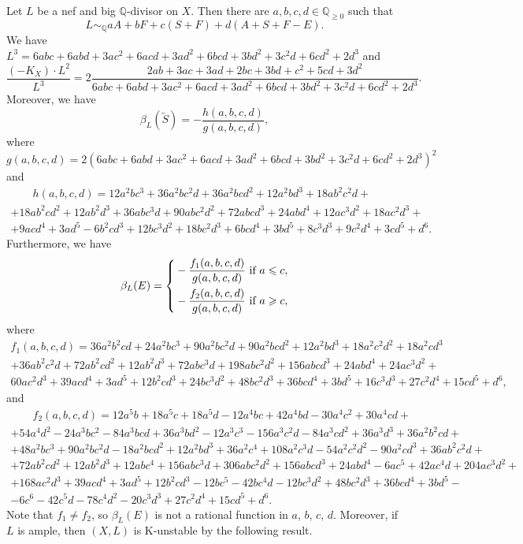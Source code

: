\documentclass[12pt]{amsart}
\theoremstyle{definition}
\theoremstyle{remark}
\begin{document}
Let $L$ be a nef and big $\mathbb{Q}$-divisor on $X$. Then there are $a,b,c,d\in\mathbb{Q}_{\geqslant 0}$ such that
$$
L\sim_{\mathbb{Q}} aA+bF+c(S+F)+d(A+S+F-E).
$$
We have $L^3=6abc+6abd+3ac^2+6acd+3ad^2+6bcd+3bd^2+3c^2d+6cd^2+2d^3$ and
$$
\frac{(-K_X)\cdot L^{2}}{L^3}=2\frac{2ab+3ac+3ad+2bc+3bd+c^2+5cd+3d^2}{6abc+6abd+3ac^2+6acd+3ad^2+6bcd+3bd^2+3c^2d+6cd^2+2d^3}.
$$
Moreover, we have
$$
\beta_{L}(\widetilde{S})=-\frac{h(a,b,c,d)}{g(a,b,c,d)},
$$
where $g(a,b,c,d)=2(6abc+6abd+3ac^2+6acd+3ad^2+6bcd+3bd^2+3c^2d+6cd^2+2d^3)^2$ and
\begin{multline*}
\quad \quad h(a,b,c,d)=12a^2bc^3+36a^2bc^2d+36a^2bcd^2+12a^2bd^3+18ab^2c^2d+\\
+18ab^2cd^2+12ab^2d^3+36abc^3d+90abc^2d^2+72abcd^3+24abd^4+12ac^3d^2+18ac^2d^3+\\
+9acd^4+3ad^5-6b^2cd^3+12bc^3d^2+18bc^2d^3+6bcd^4+3bd^5+8c^3d^3+9c^2d^4+3cd^5+d^6.\quad \quad \quad
\end{multline*}
Furthermore, we have
$$
\beta_{L}(E)=
\left\{\aligned
&-\frac{f_1(a,b,c,d)}{g(a,b,c,d)}\ \text{if $a\leqslant c$},\\
&-\frac{f_2(a,b,c,d)}{g(a,b,c,d)}\ \text{if $a\geqslant c$},
\endaligned
\right.
$$
where
\begin{multline*}
f_1(a,b,c,d)=36a^2b^2cd+24a^2bc^3+90a^2bc^2d+90a^2bcd^2+12a^2bd^3
+18a^2c^2d^2+18a^2cd^3\\+36ab^2c^2d+72ab^2cd^2+12ab^2d^3+72abc^3d+198abc^2d^2
+156abcd^3+24abd^4+24ac^3d^2+\\60ac^2d^3+39acd^4+3ad^5+12b^2cd^3+24bc^3d^2
+48bc^2d^3+36bcd^4+3bd^5+16c^3d^3+27c^2d^4+15cd^5+d^6,\quad \quad \quad \quad \quad \quad
\end{multline*}
and
\begin{multline*}
\quad \quad f_2(a,b,c,d)=12a^5b+18a^5c+18a^5d-12a^4bc+42a^4bd-30a^4c^2+30a^4cd+\\
+54a^4d^2-24a^3bc^2-84a^3bcd+36a^3bd^2-12a^3c^3-156a^3c^2d-84a^3cd^2+36a^3d^3+36a^2b^2cd+\\
+48a^2bc^3+90a^2bc^2d-18a^2bcd^2+12a^2bd^3+36a^2c^4+108a^2c^3d-54a^2c^2d^2-90a^2cd^3+36ab^2c^2d+\\
+72ab^2cd^2+12ab^2d^3+12abc^4+ 156abc^3d+306abc^2d^2+156abcd^3+24abd^4-6ac^5+42ac^4d+204ac^3d^2+\\
+168ac^2d^3+39acd^4+3ad^5+12b^2cd^3-12bc^5-42bc^4d-12bc^3d^2+48bc^2d^3+36bcd^4+3bd^5-\\
-6c^6-42c^5d-78c^4d^2-20c^3d^3+27c^2d^4+15cd^5+d^6.\quad \quad \quad \quad \quad \quad
\end{multline*}
Note that $f_1\ne f_2$, so $\beta_L(E)$ is not a rational function in $a$, $b$, $c$, $d$. Moreover, if $L$ is ample, then $(X,L)$ is K-unstable  by the following result.
\end{document}
